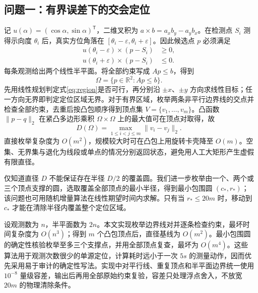 \subsection{问题一：有界误差下的交会定位}

记 $u(\alpha)=(\cos\alpha,\sin\alpha)^\mathsf{T}$，二维叉积为
$a\times b=a_xb_y-a_yb_x$。在检测点 $S_i$ 测得示向度
$\theta_i$ 后，真实方位角落在
$[\theta_i-\varepsilon,\theta_i+\varepsilon]$。因此候选点 $p$ 必须满足
\begin{equation}
\begin{split}
u(\theta_i-\varepsilon)\times(p-S_i)&\ge 0,\\
u(\theta_i+\varepsilon)\times(p-S_i)&\le 0.
\end{split}
\label{eq:wedge}
\end{equation}
每条观测给出两个线性半平面。将全部约束写成 $Ap\le b$，得到
\begin{equation}
\Omega=\{p\in\mathbb{R}^2:Ap\le b\}.
\label{eq:region}
\end{equation}
先用线性规划判定式\eqref{eq:region}是否可行，再分别沿 $\pm x$、$\pm y$ 方向求线性目标；任一方向无界即判定定位区域无界。对于有界区域，枚举两条非平行边界线的交点并检查全部约束，去重后按凸包顺序得到顶点集
$V=\{v_1,\ldots,v_m\}$。凸函数 $\|p-q\|_2$ 在紧凸多边形乘积
$\Omega\times\Omega$ 上的最大值可在顶点对取得，故
\begin{equation}
D(\Omega)=\max_{1\le i<j\le m}\|v_i-v_j\|_2.
\label{eq:diameter}
\end{equation}
直接枚举复杂度为 $O(m^2)$，规模较大时可在凸包上用旋转卡壳降至
$O(m)$\cite{orourke1998}。空集、无界集与退化为线段或单点的情况分别返回状态，避免用人工大矩形产生虚假有限直径。

仅知道直径 $D$ 不能保证存在半径 $D/2$ 的覆盖圆。我们进一步枚举由一个、两个或三个顶点支撑的圆，选取覆盖全部顶点的最小半径，得到最小包围圆 $(c_*,r_*)$；该问题也可用随机增量算法在线性期望时间内求解\cite{welzl1991}。只有当 $r_*\le20\unit{m}$ 时，移动到 $c_*$ 才能在清除半径内覆盖整个定位区域。

设观测数为 $n$，半平面数为 $2n$。本文实现枚举边界线对并逐条检查约束，最坏时间复杂度为 $O(n^3)$；得到 $m$ 个凸包顶点后，直径基线为 $O(m^2)$。最小包围圆的确定性核验枚举至多三个支撑点，并用全部顶点复查，最坏为 $O(m^4)$。这些算法用于观测次数很少的单源定位，计算耗时远小于一次 $5\unit{s}$ 的测量动作，因而优先采用易于审计的确定性写法。实现中对平行线、重复顶点和半平面边界统一使用 $10^{-8}$ 量级容差，输出后再用全部原始约束复验，容差只处理浮点舍入，不放宽 $20\unit{m}$ 的物理清除条件。

